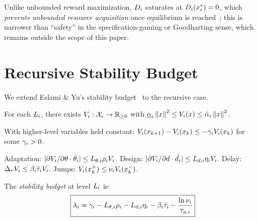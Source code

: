 \documentclass[conference]{IEEEtran}
\begin{document}
Unlike unbounded reward maximization, $D_{i}$ saturates at
$D_{i}(x^*_{i}) = 0$, which \emph{prevents unbounded resource
acquisition} once equilibrium is
reached~\cite{mineault2024neuroai}; this is narrower than ``safety''
in the specification-gaming or Goodharting sense, which remains
outside the scope of this paper.

\section{Recursive Stability Budget}
\label{sec:stability}

We extend Eslami \& Yu's stability budget~\cite{eslami2026control} to the
recursive case.

\begin{assumption}
\label{ass:per-level}
For each $L_{i}$, there exists $V_{i} : \mathcal{X}_i \to \mathbb{R}_{\geq 0}$ with
$\underline{\alpha}_i \left\| x \right\|^2 \leq V_{i}(x)
\leq \bar{\alpha}_i \left\| x \right\|^2$.
\end{assumption}

\begin{assumption}
\label{ass:decay}
With higher-level variables held constant:
$V_{i}(x_{k+1}) - V_{i}(x_k) \leq -\gamma_i V_{i}(x_k)$
for some $\gamma_i > 0$.
\end{assumption}

\begin{assumption}
\label{ass:coupling}
Adaptation: $|\partial V_{i}/\partial\theta \cdot \dot{\theta}_i|
\leq L_{\theta,i}\rho_iV_{i}$.
Design: $|\partial V_{i}/\partial d \cdot \dot d_i|
\leq L_{d,i}\eta_iV_{i}$.
Delay: $\Delta_\tau V_{i} \leq \beta_i\bar{\tau}_iV_{i}$.
Jumps: $V_{i}(x_k^+) \leq \nu_iV_{i}(x_k^-)$.
\end{assumption}

\begin{definition}
\label{def:budget}
The \emph{stability budget} at level $L_{i}$ is:
\begin{equation}
  \boxed{
  \stab_i = \decay_i - L_{\param,i}\rho_i - L_{d,i}\eta_i
  - \beta_i\taubar_i - \frac{\ln\nu_i}{\taua[i]}
  }
  \label{eq:budget}
\end{equation}
\end{definition}
\end{document}
